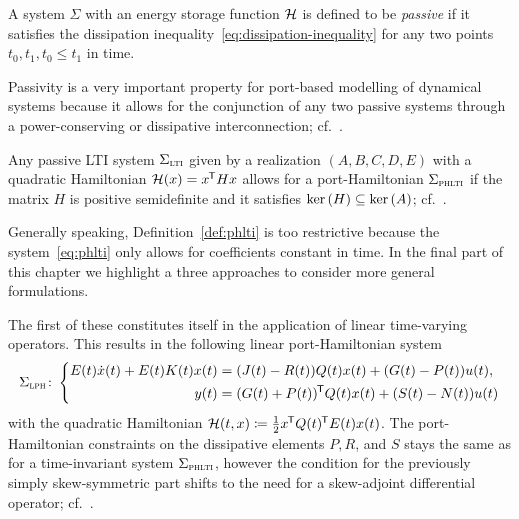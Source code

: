 \begin{definition}\label{def:passivity}
    A system $\Sigma$ with an energy storage function $\mathcal{H}$ is defined to be \emph{passive} if it satisfies the dissipation inequality~\eqref{eq:dissipation-inequality} for any two points $t_0, t_1, t_0 \leq t_1$ in time.
\end{definition}

\begin{remark}
    Passivity is a very important property for port-based modelling of dynamical systems because it allows for the conjunction of any two passive systems through a power-conserving or dissipative interconnection; cf.~\cite{Mehrmann2022, Morandin2022}.
\end{remark}

\begin{remark}
    Any passive LTI system $\Sigma_{\textnormal{\scshape lti}}$ given by a realization $(A, B, C, D, E)$ with a quadratic Hamiltonian $\mathcal{H}(x) = x^{\mkern-1.5mu \mathsf{T}} H x$ allows for a port-Hamiltonian $\Sigma_{\textnormal{\scshape phlti}}$ if the matrix $H$ is positive semidefinite and it satisfies $\mathop{}\!\mathrm{ker}\left(H\right) \subseteq \mathop{}\!\mathrm{ker}\left(A\right)$; cf.~\cite[Theorem~7.1]{VanDerSchaft2014}.
\end{remark}

Generally speaking, Definition~\ref{def:phlti} is too restrictive because the system~\eqref{eq:phlti} only allows for coefficients constant in time.
In the final part of this chapter we highlight a three approaches to consider more general formulations.

\begin{remark}
    The first of these constitutes itself in the application of linear time-varying operators.
    This results in the following linear port-Hamiltonian system
    \begin{equation}\label{eq:lph}
        \Sigma_{\textnormal{\scshape lph}} \colon \left\lbrace
        \begin{aligned}
            E(t) \dot{x}(t) + E(t) K(t) x(t) &= (J(t) - R(t)) Q(t) x(t) + (G(t) - P(t)) u(t), \\
            y(t) &= (G(t) + P(t))^{\mkern-1.5mu \mathsf{T}} Q(t) x(t) + (S(t) - N(t)) u(t)
        \end{aligned}
        \right.
    \end{equation}
    with the quadratic Hamiltonian $\mathcal{H}(t, x) \coloneqq \frac{1}{2} x^{\mkern-1.5mu \mathsf{T}} Q(t)^{\mkern-1.5mu \mathsf{T}} E(t) x(t)$.
    The port-Hamiltonian constraints on the dissipative elements $P, R$, and $S$ stays the same as for a time-invariant system $\Sigma_{\textnormal{\scshape phlti}}$, however the condition for the previously simply skew-symmetric part shifts to the need for a skew-adjoint differential operator; cf.~\cite[Definition~4.8]{Mehrmann2022}.
\end{remark}

